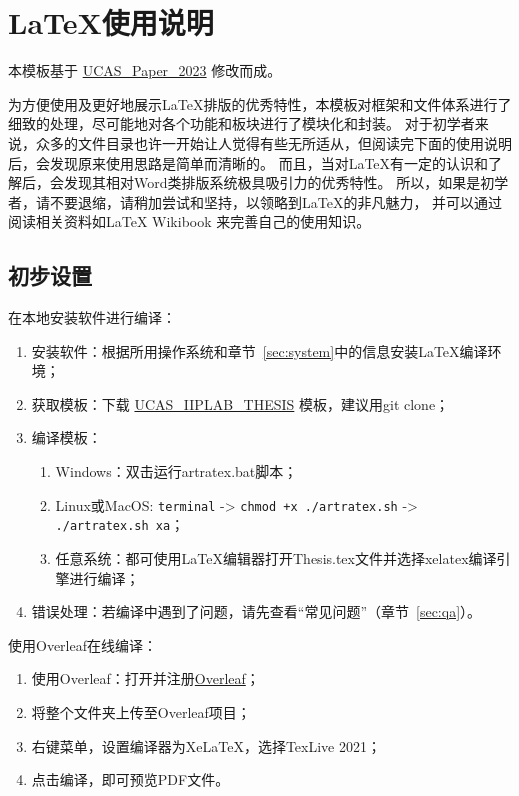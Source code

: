 
\chapter{LaTeX使用说明}\label{chap:guide}

本模板基于 \href{https://github.com/streamer-AP/UCAS\_Paper\_2023}{UCAS\_Paper\_2023} 修改而成。

为方便使用及更好地展示LaTeX排版的优秀特性，本模板对框架和文件体系进行了细致的处理，尽可能地对各个功能和板块进行了模块化和封装。
对于初学者来说，众多的文件目录也许一开始让人觉得有些无所适从，但阅读完下面的使用说明后，会发现原来使用思路是简单而清晰的。
而且，当对\LaTeX{}有一定的认识和了解后，会发现其相对Word类排版系统极具吸引力的优秀特性。
所以，如果是初学者，请不要退缩，请稍加尝试和坚持，以领略到\LaTeX{}的非凡魅力，
并可以通过阅读相关资料如\LaTeX{} Wikibook \citep{wikibook2014latex} 来完善自己的使用知识。

\section{初步设置}

在本地安装软件进行编译：
\begin{enumerate}
    \item 安装软件：根据所用操作系统和章节~\ref{sec:system}中的信息安装\LaTeX{}编译环境；
    \item 获取模板：下载 \href{https://github.com/jianxuecn/UCAS\_IIPLAB\_THESIS}{UCAS\_IIPLAB\_THESIS} 模板，建议用git clone；
    \item 编译模板：
        \begin{enumerate}
            \item Windows：双击运行artratex.bat脚本；
            \item Linux或MacOS: {\scriptsize \verb|terminal| -> \verb|chmod +x ./artratex.sh| -> \verb|./artratex.sh xa|}；
            \item 任意系统：都可使用\LaTeX{}编辑器打开Thesis.tex文件并选择xelatex编译引擎进行编译；
        \end{enumerate}
    \item 错误处理：若编译中遇到了问题，请先查看“常见问题”（章节~\ref{sec:qa}）。
\end{enumerate}

使用Overleaf在线编译：
\begin{enumerate}
    \item 使用Overleaf：打开并注册\href{https://cn.overleaf.com/}{Overleaf}；
    \item 将整个文件夹上传至Overleaf项目；
    \item 右键菜单，设置编译器为XeLaTeX，选择TexLive 2021；
    \item 点击编译，即可预览PDF文件。
\end{enumerate}

